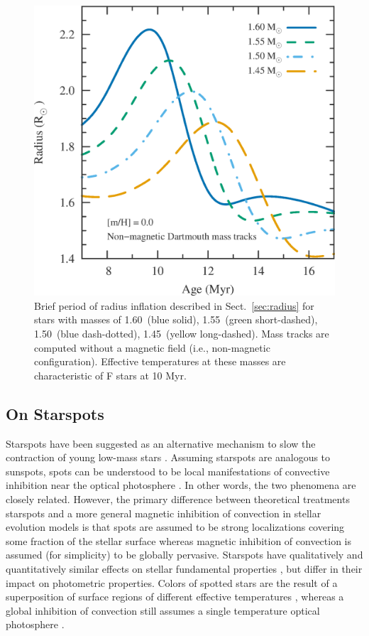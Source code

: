 \documentclass{aa}
\begin{document}
\begin{figure}
    \centering
    \includegraphics[width=0.85\linewidth]{radius_bump.eps}
    \caption{Brief period of radius inflation described in Sect.~\ref{sec:radius} for stars with masses of 1.60\msun\ (blue solid), 1.55\msun\ (green short-dashed), 1.50\msun\ (blue dash-dotted), 1.45\msun\ (yellow long-dashed). Mass tracks are computed without a magnetic field (i.e., non-magnetic configuration). Effective temperatures at these masses are characteristic of F stars at 10 Myr.}
    \label{fig:bump}
\end{figure}

\subsection{On Starspots}
Starspots have been suggested as an alternative mechanism to slow the contraction of young low-mass stars \citep{Jackson2009, MM10, Jackson2014a, Somers2015b}. Assuming starspots are analogous to sunspots, spots can be understood to be local manifestations of convective inhibition near the optical photosphere \citep{Biermann1941,Deinzer1965}. In other words, the two phenomena are closely related. However, the primary difference between theoretical treatments starspots and a more general magnetic inhibition of convection in stellar evolution models is that spots are assumed to be strong localizations covering some fraction of the stellar surface whereas magnetic inhibition of convection is assumed (for simplicity) to be globally pervasive. Starspots have qualitatively and quantitatively similar effects on stellar fundamental properties \citep[radius, \teff, luminosity;][]{Spruit1982a,Spruit1986,Somers2015b}, but differ in their impact on photometric properties. Colors of spotted stars are the result of a superposition of surface regions of different effective temperatures \citep{Spruit1986}, whereas a global inhibition of convection still assumes a single temperature optical photosphere \citep{Jackson2014a}.
\end{document}
